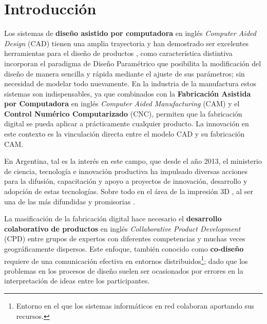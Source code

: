 \cleardoublepage
\chapter{Introducción}
\label{chap:cap1}
Los sistemas de \textbf{diseño asistido por computadora} en inglés \textit{Computer Aided Design} (\Gls{CAD}) tienen una amplia trayectoria y han demostrado ser excelentes herramientas para el diseño de productos \citep{Chao2001}, como característica distintiva incorporan el paradigma de Diseño Paramétrico \citep{Davis2013} que posibilita la modificación del diseño de manera sencilla y rápida mediante el ajuste de sus parámetros; sin necesidad de modelar todo nuevamente.
En la industria de la manufactura estos sistemas son indispensables, ya que combinados con la \textbf{Fabricación Asistida por Computadora} en inglés \textit{Computer Aided Manufacturing}  (\Gls{CAM}) y el \textbf{Control Numérico Computarizado} (\Gls{CNC}), permiten que la fabricación digital \citep{Chryssolouris2009} se pueda aplicar a prácticamente cualquier producto. La innovación en este contexto es la vinculación directa entre el modelo CAD y su fabricación CAM. 

En Argentina, tal es la interés en este campo, que desde el año 2013, el ministerio de ciencia, tecnología e innovación productiva ha impulsado diversas acciones para la difusión, capacitación y apoyo a proyectos de innovación, desarrollo y adopción de estas tecnologías. Sobre todo en el área de la impresión 3D \citep{BERMAN2012155}, al ser una de las más difundidas y promisorias \citep{MinisteriodeCiencia2015}.


La masificación de la fabricación digital hace necesario el \textbf{desarrollo colaborativo de productos} en inglés \textit{Collaborative Product Development} (\gls{CPD}) \citep{Elfving2007} entre grupos de expertos con diferentes competencias y muchas veces geográficamente dispersos. Este enfoque, también conocido como \textbf{co-diseño} \citep{PerezGarcia2014} requiere de una comunicación efectiva en entornos distribuidos\footnote{Entorno en el que los sistemas informáticos en red colaboran aportando sus recursos.}; dado que los problemas en los procesos de diseño suelen ser ocasionados por errores en la interpretación de ideas entre los participantes.


